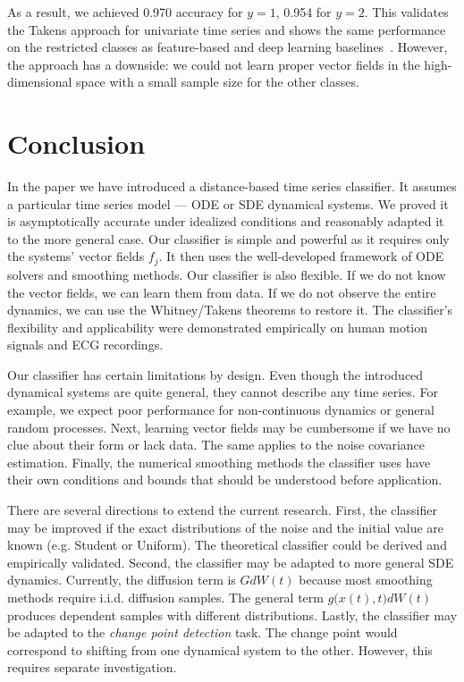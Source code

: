 \documentclass[referee, pdflatex, sn-mathphys-num]{sn-jnl}
\theoremstyle{definition}
\theoremstyle{plain}
\begin{document}
	As a result, we achieved 0.970 accuracy for $y=1$, 0.954 for $y=2$. This validates the Takens approach for univariate time series and shows the same performance on the restricted classes as feature-based and deep learning baselines~\cite{ecg_baselines}. However, the approach has a downside: we could not learn proper vector fields in the high-dimensional space with a small sample size for the other classes.
	
	\section{Conclusion}
	
	In the paper we have introduced a distance-based time series classifier. It assumes a particular time series model --- ODE or SDE dynamical systems. We proved it is asymptotically accurate under idealized conditions and reasonably adapted it to the more general case.	Our classifier is simple and powerful as it requires only the systems' vector fields $f_j$. It then uses the well-developed framework of ODE solvers and smoothing methods. Our classifier is also flexible. If we do not know the vector fields, we can learn them from data. If we do not observe the entire dynamics, we can use the Whitney/Takens theorems to restore it. The classifier's flexibility and applicability were demonstrated empirically on human motion signals and ECG recordings.
	
	Our classifier has certain limitations by design. Even though the introduced dynamical systems are quite general, they cannot describe any time series. For example, we expect poor performance for non-continuous dynamics or general random processes. Next, learning vector fields may be cumbersome if we have no clue about their form or lack data. The same applies to the noise covariance estimation. Finally, the numerical smoothing methods the classifier uses have their own conditions and bounds that should be understood before application.
	
	There are several directions to extend the current research. First, the classifier may be improved if the exact distributions of the noise and the initial value are known (e.g. Student or Uniform). The theoretical classifier could be derived and empirically validated. Second, the classifier may be adapted to more general SDE dynamics. Currently, the diffusion term is $G dW(t)$ because most smoothing methods require i.i.d. diffusion samples. The general term $g \big(x(t), t \big) dW(t)$ produces dependent samples with different distributions. Lastly, the classifier may be adapted to the \emph{change point detection} task. The change point would correspond to shifting from one dynamical system to the other. However, this requires separate investigation.
	
\end{document}
